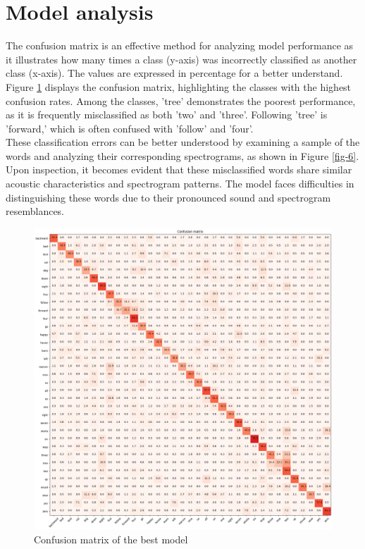 \documentclass{class}
\begin{document}
\section{Model analysis}
The confusion matrix is an effective method for analyzing model performance as it illustrates how many times a class (y-axis)
was incorrectly classified as another class (x-axis). The values are expressed in percentage for a better understand. \\
Figure \ref{fig-5} displays the confusion matrix, highlighting the classes with the highest confusion rates.
Among the classes, 'tree' demonstrates the poorest performance, as it is frequently misclassified as both 'two' and 'three'.
Following 'tree' is 'forward,' which is often confused with 'follow' and 'four'. \\
These classification errors can be better understood by examining a sample of the words
and analyzing their corresponding spectrograms, as shown in Figure \ref*{fig-6}.
Upon inspection, it becomes evident that these misclassified words share similar acoustic characteristics and spectrogram patterns.
The model faces difficulties in distinguishing these words due to their pronounced sound and spectrogram resemblances.
\begin{figure}[H]
  \centering
  \includegraphics[width=.8\columnwidth]{images/confusion_matrix.png}
  \caption{Confusion matrix of the best model}
  \label{fig-5}
\end{figure}
\end{document}
